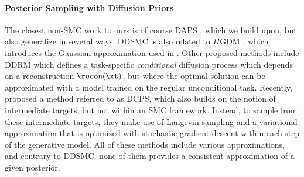 \paragraph{Posterior Sampling with Diffusion Priors}
The closest non-SMC work to ours is of course DAPS \cite{zhang_improving_2024}, which we build upon, but also generalize in several ways. DDSMC is also related to $\Pi$GDM \citep{song2023pseudoinverseguided}, which introduces the Gaussian approximation used in . %
Other proposed methods include DDRM \cite{kawar_denoising_2022} which defines a task-specific \emph{conditional} diffusion process which depends on a reconstruction $\recon(\xt)$, but where the optimal solution can be approximated with a model trained on the regular unconditional task. Recently, \citet{janati_divide-and-conquer_2024} proposed a method referred to as DCPS, which also builds on the notion of intermediate targets, but not within an SMC framework. Instead, to sample from these intermediate targets, they make use of Langevin sampling and a variational approximation that is optimized with stochastic gradient descent within each step of the generative model. 
All of these methods include various approximations, and contrary to DDSMC, none of them provides a consistent approximation of a given posterior.
